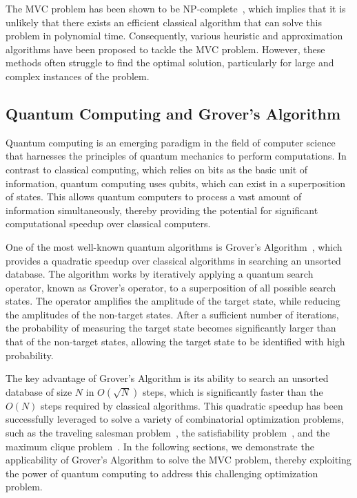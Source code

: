 The MVC problem has been shown to be NP-complete~\cite{garey1979computers}, which implies that it is unlikely that there exists an efficient classical algorithm that can solve this problem in polynomial time. Consequently, various heuristic and approximation algorithms have been proposed to tackle the MVC problem. However, these methods often struggle to find the optimal solution, particularly for large and complex instances of the problem.

\subsection{Quantum Computing and Grover's Algorithm}

Quantum computing is an emerging paradigm in the field of computer science that harnesses the principles of quantum mechanics to perform computations. In contrast to classical computing, which relies on bits as the basic unit of information, quantum computing uses qubits, which can exist in a superposition of states. This allows quantum computers to process a vast amount of information simultaneously, thereby providing the potential for significant computational speedup over classical computers.

One of the most well-known quantum algorithms is Grover's Algorithm~\cite{grover1996fast}, which provides a quadratic speedup over classical algorithms in searching an unsorted database. The algorithm works by iteratively applying a quantum search operator, known as Grover's operator, to a superposition of all possible search states. The operator amplifies the amplitude of the target state, while reducing the amplitudes of the non-target states. After a sufficient number of iterations, the probability of measuring the target state becomes significantly larger than that of the non-target states, allowing the target state to be identified with high probability.

The key advantage of Grover's Algorithm is its ability to search an unsorted database of size $N$ in $O(\sqrt{N})$ steps, which is significantly faster than the $O(N)$ steps required by classical algorithms. This quadratic speedup has been successfully leveraged to solve a variety of combinatorial optimization problems, such as the traveling salesman problem~\cite{durr1996quantum}, the satisfiability problem~\cite{montanaro2015quantum}, and the maximum clique problem~\cite{jiang2017approximate}. In the following sections, we demonstrate the applicability of Grover's Algorithm to solve the MVC problem, thereby exploiting the power of quantum computing to address this challenging optimization problem.

